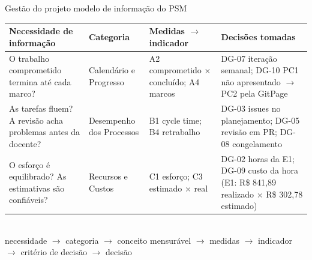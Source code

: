 \documentclass[aspectratio=169,10pt]{beamer}
\begin{document}
\begin{frame}{Gestão do projeto \textperiodcentered{} modelo de informação do PSM}
\scriptsize
\begin{tabularx}{\linewidth}{p{4.1cm}p{2.3cm}p{2.8cm}L}
\toprule
Necessidade de informação & Categoria & Medidas $\rightarrow$ indicador & Decisões tomadas \\
\midrule
O trabalho comprometido termina até cada marco? & Calendário e Progresso & A2 comprometido $\times$ concluído; A4 marcos & DG-07 iteração semanal; DG-10 PC1 não apresentado $\rightarrow$ PC2 pela GitPage \\
As tarefas fluem? A revisão acha problemas antes da docente? & Desempenho dos Processos & B1 cycle time; B4 retrabalho & DG-03 issues no planejamento; DG-05 revisão em PR; DG-08 congelamento \\
O esforço é equilibrado? As estimativas são confiáveis? & Recursos e Custos & C1 esforço; C3 estimado $\times$ real & DG-02 horas da E1; DG-09 custo da hora (E1: R\$ 841,89 realizado $\times$ R\$ 302,78 estimado) \\
\bottomrule
\end{tabularx}\\[0.6em]
{\tiny necessidade $\rightarrow$ categoria $\rightarrow$ conceito mensurável $\rightarrow$ medidas $\rightarrow$ indicador $\rightarrow$ critério de decisão $\rightarrow$ decisão}
\end{frame}
\end{document}
